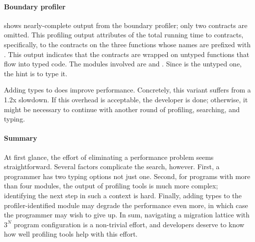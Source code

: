 \paragraph{Boundary profiler}  shows nearly-complete
output from the boundary profiler; only two contracts are omitted.  This
profiling output attributes  of the total running time to
contracts, specifically, to the contracts on the three functions whose names are
prefixed with . This output indicates that the contracts are
wrapped on untyped functions that flow into typed code. The modules involved are
 and .  Since  is the untyped one, the hint is to
type it.

Adding types to  does improve performance. Concretely, this variant
suffers from a 1.2x slowdown.  If this overhead is acceptable, the developer is
done; otherwise, it might be necessary to continue with another round of
profiling, searching, and typing.


\paragraph{Summary}

At first glance, the effort of eliminating a performance problem seems
straightforward. Several factors complicate the search, however. First, a
programmer has two typing options not just one. Second, for programs with more
than four modules, the output of profiling tools is much more complex;
identifying the next step in such a context is hard. Finally, adding types to the
profiler-identified module may degrade the performance even more, in which case
the programmer may wish to give up. In sum, navigating a migration lattice with
$3^N$ program configuration is a non-trivial effort, and developers deserve to
know how well profiling tools help with this effort. 


